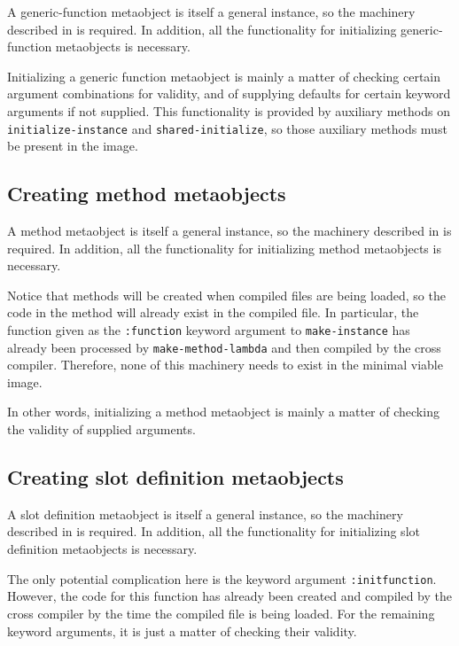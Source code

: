 A generic-function metaobject is itself a general instance, so the
machinery described in
 is required.  In
addition, all the functionality for initializing generic-function
metaobjects is necessary.

Initializing a generic function metaobject is mainly a matter of
checking certain argument combinations for validity, and of supplying
defaults for certain keyword arguments if not supplied.  This
functionality is provided by auxiliary methods on
\texttt{initialize-instance} and \texttt{shared-initialize}, so those
auxiliary methods must be present in the image.

\subsection{Creating method metaobjects}

A method metaobject is itself a general instance, so the machinery
described in  is
required.  In addition, all the functionality for initializing method
metaobjects is necessary.

Notice that methods will be created when compiled files are being
loaded, so the code in the method will already exist in the compiled
file.  In particular, the function given as the \texttt{:function}
keyword argument to \texttt{make-instance} has already been processed
by \texttt{make-method-lambda} and then compiled by the cross
compiler.  Therefore, none of this machinery needs to exist in the
minimal viable image.

In other words, initializing a method metaobject is mainly a matter of
checking the validity of supplied arguments.

\subsection{Creating slot definition metaobjects}

A slot definition metaobject is itself a general instance, so the
machinery described in
 is required.  In
addition, all the functionality for initializing slot definition
metaobjects is necessary.

The only potential complication here is the keyword argument
\texttt{:initfunction}.  However, the code for this function has
already been created and compiled by the cross compiler by the time
the compiled file is being loaded.  For the remaining keyword
arguments, it is just a matter of checking their validity.

